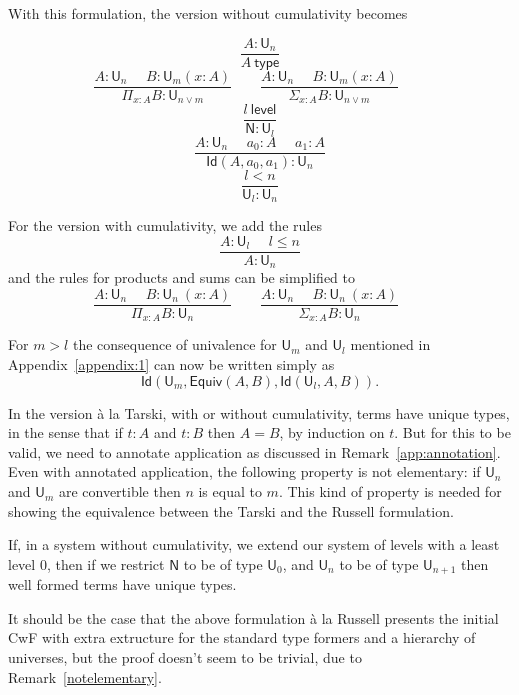 \documentclass[a4paper,UKenglish,cleveref, autoref, thm-restate]{lipics-v2021}
\newcommand{\Id}{\mathsf{Id}}
\newcommand{\NN}{\mathsf{N}}
\newcommand{\UU}{\mathsf{U}}
\newcommand{\Level}{\mathsf{level}}
\newcommand{\type}{\mathsf{type}}
\newcommand{\mypi}[3]{\Pi_{#1:#2}#3}
\newcommand{\mysig}[3]{\Sigma_{#1:#2}#3}
\newcommand{\Equiv}{\mathsf{Equiv}}
\begin{document}
With this formulation, the version without cumulativity becomes

$$
\frac{A:\UU_{n}}{A~\type}
$$
$$
\frac{A:\UU_{n}~~~~~~B:\UU_m(x:A)}
     {\mypi{x}{A}{B}:\UU_{n\vee m}}~~~~~~~~~
\frac{A:\UU_{n}~~~~~~B:\UU_m(x:A)}
     {\mysig{x}{A}{B}:\UU_{n\vee m}}~~~~~~~~~
$$
$$\frac{l~\Level}{\NN:\UU_{l}}$$
$$
\frac{A:\UU_n~~~~~~a_0:A~~~~~~a_1:A}{\Id(A,a_0,a_1):\UU_n}
$$
$$
\frac{l<n}{{\UU_l}:\UU_{n}}
$$

\medskip

For the version with cumulativity, we add the rules
$$
\frac{A:\UU_{l}~~~~~~l\leqslant n}{A:\UU_{n}}
$$
and the rules for products and sums can be simplified to
$$
\frac{A:\UU_{n}~~~~~~B:\UU_n~(x:A)}
     {\mypi{x}{A}{B}:\UU_{n}}~~~~~~~~~
\frac{A:\UU_{n}~~~~~~B:\UU_n~(x:A)}
     {\mysig{x}{A}{B}:\UU_{n}}~~~~~~~~~
$$

     For $m>l$ the consequence of univalence for $\UU_m$ and $\UU_l$
     mentioned in Appendix~\ref{appendix:1} can now be written
     simply as
     $$\Id(\UU_m,\Equiv(A,B),\Id(\UU_l,A,B)).$$



\begin{remark}\label{notelementary}
  In the version \`a la Tarski, with or without cumulativity, terms have unique types, in the sense that if $t : A$ and $t : B$ then $A = B$, by induction on $t$. But for this to be valid, we need to annotate application as discussed in Remark~\ref{app:annotation}.
  Even with annotated application, the following property is not elementary: if $\UU_n$ and $\UU_m$ are convertible then $n$ is equal to $m$. This kind of property is needed for showing the equivalence between the Tarski and the Russell formulation.
\end{remark}

\begin{remark} \label{uniqueness:without:cumulativity}
If, in a system without cumulativity, we extend our system of levels with a least level 0, then if we restrict $\NN$ to be of type $\UU_0$, and $\UU_n$ to be of type $\UU_{n+1}$ then well formed terms have unique types.
\end{remark}

\begin{remark}
  It should be the case that the above formulation \`a la Russell presents the initial CwF with extra extructure for the standard type formers and a hierarchy of universes, but the proof doesn't seem to be trivial, due to Remark~\ref{notelementary}.
\end{remark}
\end{document}
